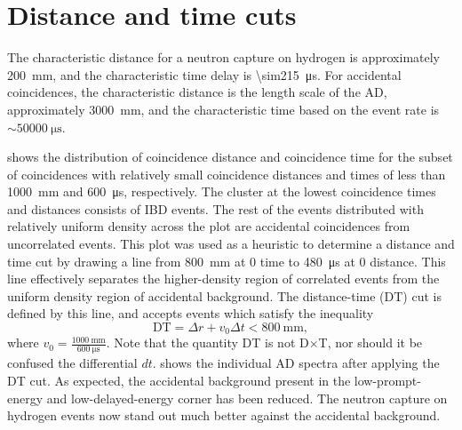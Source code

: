 \section{Distance and time cuts}
\label{sec:DT_cut}

The characteristic distance for a neutron capture on hydrogen
is approximately \SI{200}{\milli\meter},
and the characteristic time delay is \SI{\sim215}{\us}.
For accidental coincidences, the characteristic distance is
the length scale of the AD, approximately \SI{3000}{\milli\meter},
and the characteristic time based on the  event rate
is $\sim\SI{50000}{\us}$.


 shows the distribution of
coincidence distance and coincidence time
for the subset of  coincidences with
relatively small coincidence distances and times
of less than \SI{1000}{\milli\meter} and \SI{600}{\micro\second},
respectively.
The cluster at the lowest coincidence times and distances
consists of IBD events.
The rest of the events distributed with relatively uniform density
across the plot are accidental coincidences from uncorrelated events.
This plot was used as a heuristic to determine a distance and time cut
by drawing a line from \SI{800}{\milli\meter} at $0$ time
to \SI{480}{\micro\second} at $0$ distance.
This line effectively separates the higher-density region
of correlated events from the uniform density region of accidental background.
The distance-time (DT) cut is defined by this line,
and accepts events which satisfy the inequality
\begin{equation}
    \text{DT} = \Delta r + v_0 \Delta t < \SI{800}{\milli\meter},
\end{equation}
where $v_0 = \frac{\SI{1000}{\milli\meter}}{\SI{600}{\micro\second}}$.
Note that the quantity DT is not D$\times$T,
nor should it be confused the differential $dt$.
 shows the individual AD spectra
after applying the DT cut.
As expected, the accidental background present
in the low-prompt-energy and low-delayed-energy corner has been reduced.
The neutron capture on hydrogen events now stand out much better
against the accidental background.


